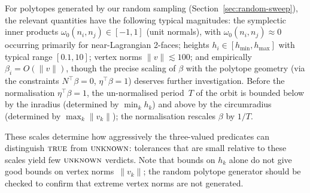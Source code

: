 \begin{remark}\label{rem:parameter-scales}
For polytopes generated by our random sampling
(Section~\ref{sec:random-sweep}),
the relevant quantities have the following typical magnitudes:
the symplectic inner products
$\omega_0(n_i, n_j) \in [-1, 1]$ (unit normals),
with $\omega_0(n_i, n_j) \approx 0$ occurring primarily
for near-Lagrangian 2-faces;
heights $h_i \in [h_{\min}, h_{\max}]$ with typical range
$[0.1, 10]$;
vertex norms $\|v\| \lesssim 100$;
and empirically $\beta_i = O(\|v\|)$, though the precise
scaling of $\beta$ with the polytope geometry (via the
constraints $N^\top \beta = 0$, $\eta^\top \beta = 1$)
deserves further investigation.
Before the normalisation $\eta^\top \beta = 1$,
the un-normalised period~$T$ of the orbit is bounded below
by the inradius (determined by $\min_k h_k$) and above by
the circumradius (determined by $\max_k \|v_k\|$);
the normalisation rescales $\beta$ by $1/T$.

These scales determine how aggressively the three-valued
predicates can distinguish $\textsc{true}$ from
$\textsc{unknown}$:
tolerances that are small relative to these scales yield
few $\textsc{unknown}$ verdicts.
Note that bounds on $h_k$ alone do not give good bounds on
vertex norms~$\|v_k\|$;
the random polytope generator should be checked to confirm
that extreme vertex norms are not generated.
\end{remark}
